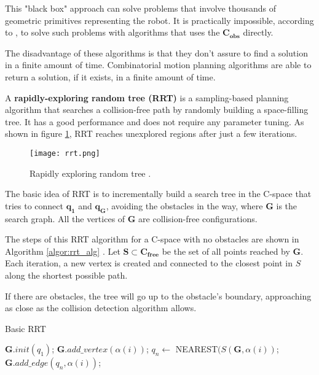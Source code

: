 This "black box" approach can solve problems that involve thousands of geometric primitives representing the robot. It is practically impossible, according to \citet{Handbook}, to solve such problems with algorithms that uses the $\bm{C_{obs}}$ directly.

The disadvantage of these algorithms is that they don't assure to find a solution in a finite amount of time. Combinatorial motion planning algorithms are able to return a solution, if it exists, in a finite amount of time.

A \textbf{rapidly-exploring random tree (RRT)} is a sampling-based planning algorithm that searches a collision-free path by randomly building a space-filling tree. It has a good performance and does not require any parameter tuning. As shown in figure \ref{fig:rrt}, RRT reaches unexplored regions after just a few iterations. 
\begin{figure}[H]
	\centering
	\texttt{[image: rrt.png]}
	\vspace{-10pt}
	\caption[Rapidly exploring random tree]{Rapidly exploring random tree \citep[chap. 5, page 230]{planning}.}
	\vspace{-15pt}
	\label{fig:rrt}
\end{figure}
The basic idea of RRT is to incrementally build a search tree in the C-space that tries to connect $\bm{q_{1}}$ and $\bm{q_{G}}$, avoiding the obstacles in the way, where $\bm{G}$ is the search graph. All the vertices of $\bm{G}$ are collision-free configurations. 


The steps of this RRT algorithm for a C-space with no obstacles are shown in Algorithm \ref{algor:rrt_alg} \citep{planning}. Let $\bm{S}\subset \bm{C_{free}}$ be the set of all points reached by $\bm{G}$. Each iteration, a new vertex is created and connected to the closest point in $S$ along the shortest possible path. 

If there are obstacles, the tree will go up to the obstacle's boundary, approaching as close as the collision detection algorithm allows.

\begin{algorithm}[t!]
	\caption{Basic RRT}\label{algor:rrt_alg}
	\begin{algorithmic}[1]
		\State $\bm{G}.init(q_{1})$;
		\vspace{-2pt}
		\State $\bm{G}.add\_vertex(\alpha(i))$;
		\vspace{-2pt}
		\State $q_n \longleftarrow$ NEAREST$(S(\bm{G},\alpha(i))$;
		\vspace{-2pt}
		\State $\bm{G}.add\_edge(q_n,\alpha(i))$;
		\vspace{-2pt}
		\EndFor 
	\end{algorithmic}
\end{algorithm}

